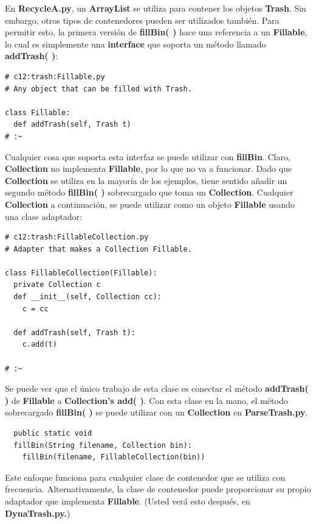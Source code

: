 \documentclass{article}
\begin{document}
En \textbf{RecycleA.py}, un \textbf{ArrayList} se utiliza para contener los objetos \textbf{Trash}. Sin embargo, otros tipos de contenedores pueden ser utilizados también. Para permitir esto, la primera versión de \textbf{fillBin( )} hace una referencia a un \textbf{Fillable}, lo cual es simplemente una \textbf{interface} que soporta un método llamado \textbf{addTrash( )}:     \newline

\begin{lstlisting} 
# c12:trash:Fillable.py  
# Any object that can be filled with Trash.

class Fillable: 
  def addTrash(self, Trash t) 
# :~ 
\end{lstlisting}

Cualquier cosa que soporta esta interfaz se puede utilizar con \textbf{fillBin}. Claro, \textbf{Collection} no implementa \textbf{Fillable}, por lo que no va a funcionar. Dado que \textbf{Collection} se utiliza en la mayoría de los ejemplos, tiene sentido añadir un segundo método \textbf{fillBin( )} sobrecargado que toma un \textbf{Collection}. Cualquier \textbf{Collection} a continuación, se puede utilizar como un objeto \textbf{Fillable} usando una clase adaptador:   \newline

\begin{lstlisting} 
# c12:trash:FillableCollection.py  
# Adapter that makes a Collection Fillable. 

class FillableCollection(Fillable): 
  private Collection c 
  def __init__(self, Collection cc):  
    c = cc  
    
  def addTrash(self, Trash t): 
    c.add(t) 
    
# :~ 
\end{lstlisting}

Se puede ver que el único trabajo de esta clase es conectar el método \textbf{addTrash( )} de \textbf{Fillable} a \textbf{Collection’s add( )}. Con esta clase en la mano, el método sobrecargado \textbf{fillBin( )}  se puede utilizar con un \textbf{Collection} en \textbf{ParseTrash.py}.   \newline

\begin{lstlisting} 
  public static void  
  fillBin(String filename, Collection bin): 
    fillBin(filename, FillableCollection(bin)) 
\end{lstlisting}

Este enfoque funciona para cualquier clase de contenedor que se utiliza con frecuencia. Alternativamente, la clase de contenedor puede proporcionar su propio adaptador que implementa \textbf{Fillable}. (Usted verá esto después, en \textbf{DynaTrash.py.})     \newline
\end{document}
